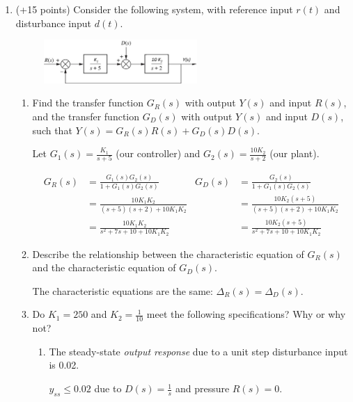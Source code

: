 \documentclass[11pt]{article}
\begin{document}
\begin{enumerate}
\begin{enumerate}
    \end{enumerate}
    \item (+15 points) Consider the following system, with reference input \(r(t)\) and disturbance input \(d(t)\).
    \begin{figure}[h!]
        \centering
        \includegraphics[width=0.55\textwidth]{./Images/Fig04-002.png}
        \end{figure}
    \begin{enumerate}
        \item Find the transfer function \(G_R(s)\) with output \(Y(s)\) and input \(R(s)\), and the transfer function \(G_D(s)\) with output \(Y(s)\) and input \(D(s)\), such that \(Y(s) = G_R(s)R(s)+G_D(s)D(s)\).
        \begin{center}
            Let \(\displaystyle G_1(s)=\frac{K_1}{s+5}\) (our controller) and \(\displaystyle G_2(s)=\frac{10K_2}{s+2}\) (our plant).
        \end{center}
        \begin{align*}
            G_R(s)&=\frac{G_1(s)G_2(s)}{1+G_1(s)G_2(s)} & G_D(s)&=\frac{G_2(s)}{1+G_1(s)G_2(s)}\\
            &=\frac{10K_1K_2}{(s+5)(s+2)+10K_1K_2}&&=\frac{10K_2(s+5)}{(s+5)(s+2)+10K_1K_2}\\
            &=\frac{10K_1K_2}{s^2+7s+10+10K_1K_2}&&=\frac{10K_2(s+5)}{s^2+7s+10+10K_1K_2}
        \end{align*}
        \item Describe the relationship between the characteristic equation of \(G_R(s)\) and the characteristic equation of \(G_D(s)\).
        \begin{center}
            The characteristic equations are the same: \(\Delta_R(s)=\Delta_D(s)\).
        \end{center}
        \item Do \(K_1 = 250\) and \(K_2 = \frac{1}{10}\) meet the following speciﬁcations? Why or why not?
        \begin{enumerate}
            \item The steady-state \textit{output response} due to a unit step disturbance input is 0.02.
            \begin{center}
                \( y_{ss} \leq 0.02 \) due to \( D(s)=\displaystyle\frac{1}{s} \) and pressure \(R(s)=0\).

\end{center}
\end{enumerate}
\end{enumerate}
\end{enumerate}
\end{document}
